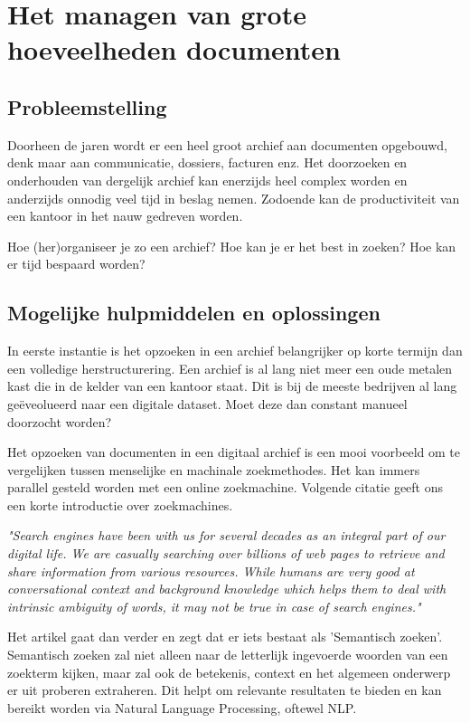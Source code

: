 \newpage


\section{Het managen van grote hoeveelheden documenten}
\subsection{Probleemstelling}
Doorheen de jaren wordt er een heel groot archief aan documenten opgebouwd, denk maar aan communicatie, dossiers, facturen enz.
Het doorzoeken en onderhouden van dergelijk archief kan enerzijds heel complex worden en anderzijds onnodig veel tijd in beslag nemen.
Zodoende kan de productiviteit van een kantoor in het nauw gedreven worden.

Hoe (her)organiseer je zo een archief? Hoe kan je er het best in zoeken? Hoe kan er tijd bespaard worden?

\subsection{Mogelijke hulpmiddelen en oplossingen}
In eerste instantie is het opzoeken in een archief belangrijker op korte termijn dan een volledige herstructurering. Een archief is al lang niet meer een oude metalen kast die in de kelder van een
kantoor staat. Dit is bij de meeste bedrijven al lang geëveolueerd naar een digitale dataset. Moet deze dan constant manueel doorzocht worden?

Het opzoeken van documenten in een digitaal archief is een mooi voorbeeld om te vergelijken tussen menselijke en machinale zoekmethodes.
Het kan immers parallel gesteld worden met een online zoekmachine. Volgende citatie geeft ons een korte introductie over zoekmachines.

\begin{displayquote}
	\textit{"Search engines have been with us for several decades as an integral part of our digital life.
		We are casually searching over billions of web pages to retrieve and share information from various resources.
		While humans are very good at conversational context and background knowledge which helps them to deal with intrinsic ambiguity of words,
		it may not be true in case of search engines."} \autocite{MediumSemanticSearch}
\end{displayquote}

Het artikel gaat dan verder en zegt dat er iets bestaat als 'Semantisch zoeken'. Semantisch zoeken zal niet alleen naar de letterlijk ingevoerde woorden van een zoekterm kijken,
maar zal ook de betekenis, context en het algemeen onderwerp er uit proberen extraheren. Dit helpt om relevante resultaten te bieden en kan bereikt worden via Natural Language Processing, oftewel NLP.

